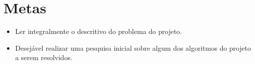 \documentclass[12pt,a4paper]{article}
\begin{document}
\section{Metas}

\begin{itemize}
\item Ler integralmente o descritivo do problema do projeto.
\item Desejável realizar uma pesquisa inicial sobre algum dos algoritmos do projeto a serem resolvidos.
\end{itemize}

\end{document}
